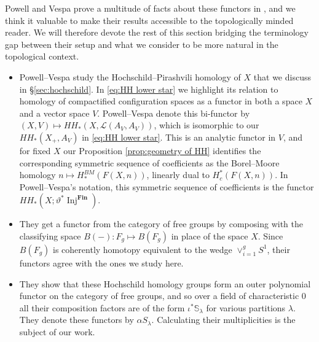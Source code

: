 \documentclass[12pt]{article}
\newcommand{\Schur}[1]{\mathbb{S}_{#1}}
\newcommand{\Loday}[2]{\mathcal{L}({#1},{#2})}
\theoremstyle{plain}
\theoremstyle{definition}
\theoremstyle{remark}
\begin{document}
Powell and Vespa prove a multitude of facts about these functors in \cite{PV18}, and we think it valuable to make their results accessible to the topologically minded reader. We will therefore devote the rest of this section bridging the terminology gap between their setup and what we consider to be more natural in the topological context.

\begin{itemize}

    \item Powell--Vespa study the Hochschild--Pirashvili homology of $X$ that we discuss in \S\ref{sec:hochschild}. In \eqref{eq:HH lower star} we highlight its relation to homology of compactified configuration spaces as a functor in both a space $X$ and a vector space $V$. Powell--Vespa denote this bi-functor by $(X, V) \mapsto HH_*(X, \Loday{A_V}{A_V})$, which is isomorphic to our $HH_*(X_+, A_V)$ in \eqref{eq:HH lower star}. This is an analytic functor in $V$, and for fixed $X$ our Proposition \ref{prop:geometry of HH} identifies the corresponding symmetric sequence of coefficients as the Borel--Moore homology $n\mapsto H_*^{BM}(F(X, n))$, linearly dual to $H_c^*(F(X, n))$. In Powell--Vespa's notation, this symmetric sequence of coefficients is the functor $HH_*(X;\vartheta^*\operatorname{Inj}^{\textbf{Fin}})$.
    
    \item They get a functor from the category of free groups by composing with the classifying space $B(-):F_g\mapsto B(F_g)$ in place of the space $X$. Since $B(F_g)$ is coherently homotopy equivalent to the wedge $\vee_{i=1}^g S^1$, their functors agree with the ones we study here.
    
    \item %
    They show that these Hochschild homology groups form an outer polynomial functor on the category of free groups, and so over a field of characteristic $0$ all their composition factors are of the form $\iota^*\Schur{\lambda}$ for various partitions $\lambda$. They denote these functors by $\alpha S_\lambda$. Calculating their multiplicities is the subject of our work.
    

\end{itemize}
\end{document}
